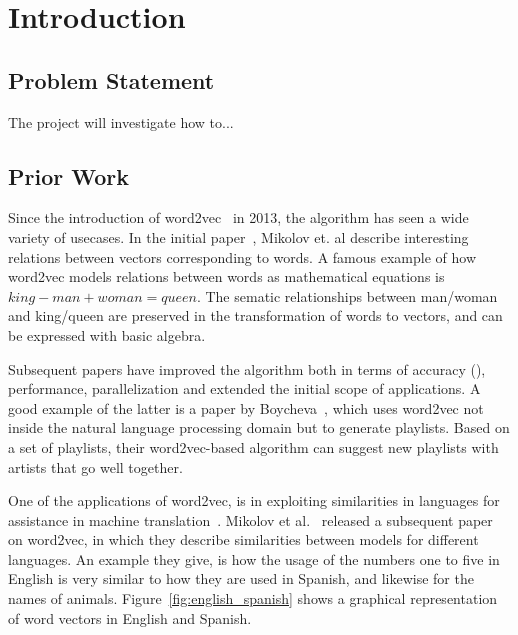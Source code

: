 \section{Introduction}


\subsection{Problem Statement}
The project will investigate how to...

\subsection{Prior Work}
Since the introduction of word2vec~\cite{mikolov2013efficient, mikolov2013distributed} in 2013, the algorithm has seen a wide variety of usecases. In the initial paper~\cite{mikolov2013efficient}, Mikolov et. al describe interesting relations between vectors corresponding to words. 
A famous example of how word2vec models relations between words as mathematical equations is $king - man + woman = queen$.
The sematic relationships between man/woman and king/queen are preserved in the transformation of words to vectors, and can be expressed with basic algebra.

Subsequent papers have improved the algorithm both in terms of accuracy (\cite{levy2014linguistic}), performance, parallelization and extended the initial scope of applications. A good example of the latter is a paper by Boycheva~\cite{boycheva2015distributional}, which uses word2vec not inside the natural language processing domain but to generate playlists. Based on a set of playlists, their word2vec-based algorithm can suggest new playlists with artists that go well together.

One of the applications of word2vec, is in exploiting similarities in languages for assistance in machine translation~\cite{wolf2014joint}. Mikolov et al.~\cite{mikolov2013exploiting} released a subsequent paper on word2vec, in which they describe similarities between models for different languages. An example they give, is how the usage of the numbers one to five in English is very similar to how they are used in Spanish, and likewise for the names of animals. Figure~\ref{fig:english_spanish} shows a graphical representation of word vectors in English and Spanish.

